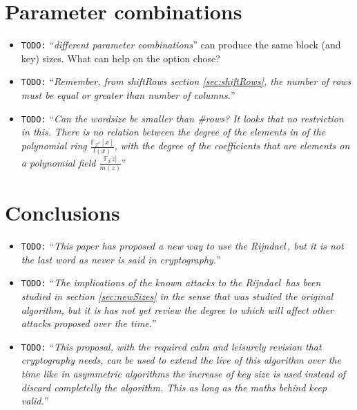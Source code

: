 \documentclass[10pt,a4paper,twoside]{llncs}
\newcommand{\todo}[1]{\texttt{\color{red}TODO:} ``\emph{#1}''}
\newcommand{\rijndael}{\emph{Rijndael}}
\newcommand{\Fpn}[2]{\ensuremath{\mathbb{F}_{#1^#2}}}
\begin{document}
\section{Parameter combinations}\label{sec:parameterCombinations}
\begin{itemize}
 \item \todo{different parameter combinations} can produce the same block (and key) sizes. What can help on the option chose?
 \item \todo{Remember, from \emph{shiftRows} section \ref{sec:shiftRows}, the number of rows must be equal or greater than number of columns.}
 \item \todo{Can the wordsize be smaller than \#rows? It looks that no restriction in this. There is no relation between the degree of the elements in of the polynomial ring $\frac{\Fpn{2}{w}[x]}{l(x)}$, with the degree of the coefficients that are elements on a polynomial field $\frac{\Fpn{2}[z]}{m(z)}$}
\end{itemize}

\section{Conclusions}\label{sec:conclusion}
\begin{itemize}
    \item \todo{This paper has proposed a new way to use the \rijndael\,, but it is not the last word as never is said in cryptography.}
    \item \todo{The implications of the known attacks to the \rijndael\, has been studied in section \ref{sec:newSizes} in the sense that was studied the original algorithm, but it is has not yet review the degree to which will affect other attacks proposed over the time.}
    \item \todo{This proposal, with the required calm and leisurely revision that cryptography needs, can be used to extend the live of this algorithm over the time like in asymmetric algorithms the increase of key size is used instead of discard completelly the algorithm. This as long as the maths behind keep valid.}
\end{itemize}
\end{document}
